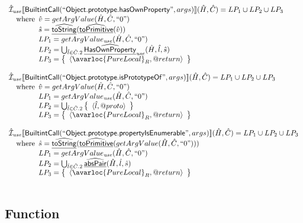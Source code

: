 \[\begin{array}{l}
\aI_{\it use}\lbr \SF{BuiltintCall}(``\SF{Object.prototype.hasOwnProperty}",args)\rbr(\hat{H},\hat{C}) = LP_1 \cup LP_2 \cup LP_3\\
\quad\wherec{
  \hat{v} = getArgValue(\hat{H},\hat{C}, ``0")\\
  \hat{s} = \ahf{toString}(\ahf{toPrimitive}(\hat{v}))\\
  LP_1 = getArgValue_{\it use}(\hat{H},\hat{C}, ``0")\\
  LP_2 = \bigcup_{\hat{l} \in \hat{C}.2} \ahf{HasOwnProperty}_{\it use}(\hat{H}, \hat{l}, \hat{s})\\
  LP_3 = \set{\langle\avarloc{PureLocal}_R,\varprop{return}\rangle}\\
  }\\
\\



\aI_{\it use}\lbr \SF{BuiltintCall}(``\SF{Object.prototype.isPrototypeOf}",args)\rbr(\hat{H},\hat{C}) = LP_1 \cup LP_2 \cup LP_3\\
\quad\wherec{
  \hat{v} = getArgValue(\hat{H},\hat{C}, ``0")\\
  LP_1 = getArgValue_{\it use}(\hat{H},\hat{C}, ``0")\\
  LP_2 = \bigcup_{\hat{l} \in \hat{C}.2}  \set{\langle \hat{l}, \varprop{proto} \rangle}\\
  LP_3 = \set{\langle\avarloc{PureLocal}_R,\varprop{return}\rangle}\\
  }\\
\\


\aI_{\it use}\lbr \SF{BuiltintCall}(``\SF{Object.prototype.propertyIsEnumerable}",args)\rbr(\hat{H},\hat{C}) = LP_1 \cup LP_2 \cup LP_3\\
\quad\wherec{
  \hat{s} = \ahf{toString}(\ahf{toPrimitive}(getArgValue(\hat{H},\hat{C}, ``0")))\\
  LP_1 = getArgValue_{\it use}(\hat{H},\hat{C}, ``0")\\
  LP_2 = \bigcup_{\hat{l} \in \hat{C}.2} \ahf{absPair}(\hat{H}, \hat{l}, \hat{s})\\
  LP_3 = \set{\langle\avarloc{PureLocal}_R,\varprop{return}\rangle}\\
  }\\
\\

\end{array}
\]

\subsection{Function}
\[
\begin{array}{l}


\end{array}
\]


